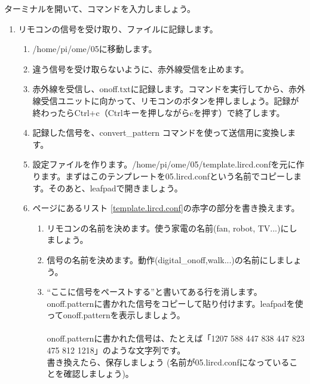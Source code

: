 \begin{tcolorbox}[title=\useOmetoi]
ターミナルを開いて、コマンドを入力しましょう。
\begin{enumerate}
\item リモコンの信号を受け取り、ファイルに記録します。
 \begin{enumerate}[1]
  \item /home/pi/ome/05に移動します。\\ 
  \item 違う信号を受け取らないように、赤外線受信を止めます。 \\ 
  \item 赤外線を受信し、onoff.txtに記録します。コマンドを実行してから、赤外線受信ユニットに向かって、リモコンのボタンを押しましょう。記録が終わったらCtrl+c（Ctrlキーを押しながらcを押す）で終了します。\\ 
  \item 記録した信号を、convert\_pattern コマンドを使って送信用に変換します。\\ 
  \item 設定ファイルを作ります。/home/pi/ome/05/template.lircd.confを元に作ります。まずはこのテンプレートを05.lircd.confという名前でコピーします。そのあと、leafpadで開きましょう。\\ 
  \item \pageref{template.lircd.conf}ページにあるリスト \ref{template.lircd.conf}の赤字の部分を書き換えます。
  \begin{enumerate}[(1)]
    \item リモコンの名前を決めます。使う家電の名前(fan, robot, TV...)にしましょう。
    \item 信号の名前を決めます。動作(digital\_onoff,walk...)の名前にしましょう。
    \item “ここに信号をペーストする”と書いてある行を消します。onoff.patternに書かれた信号をコピーして貼り付けます。leafpadを使ってonoff.patternを表示しましょう。\\ 
\\onoff.patternに書かれた信号は、たとえば「1207 588 447 838 447 823 475 812 1218」のような文字列です。\\書き換えたら、保存しましょう (名前が05.lircd.confになっていることを確認しましょう)。
  \end{enumerate}

\end{enumerate}
\end{enumerate}
\end{tcolorbox}
